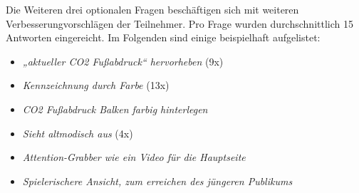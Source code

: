 Die Weiteren drei optionalen Fragen beschäftigen sich mit weiteren Verbesserungvorschlägen der Teilnehmer.
Pro Frage wurden durchschnittlich 15 Antworten eingereicht.
Im Folgenden sind einige beispielhaft aufgelistet:
\begin{itemize}
    \item \textit{„aktueller CO2 Fußabdruck“ hervorheben } (9x)
    \item \textit{Kennzeichnung durch Farbe} (13x)
    \item \textit{CO2 Fußabdruck Balken farbig hinterlegen}
    \item \textit{Sieht altmodisch aus} (4x)
    \item \textit{Attention-Grabber wie ein Video für die Hauptseite}
    \item \textit{Spielerischere Ansicht, zum erreichen des jüngeren Publikums}
\end{itemize}

